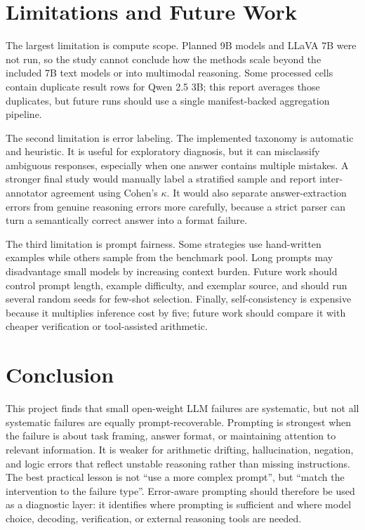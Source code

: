 \documentclass[10pt,twocolumn]{article}
\begin{document}
\section{Limitations and Future Work}
The largest limitation is compute scope. Planned 9B models and LLaVA 7B were not run, so the study cannot conclude how the methods scale beyond the included 7B text models or into multimodal reasoning. Some processed cells contain duplicate result rows for Qwen 2.5 3B; this report averages those duplicates, but future runs should use a single manifest-backed aggregation pipeline.

The second limitation is error labeling. The implemented taxonomy is automatic and heuristic. It is useful for exploratory diagnosis, but it can misclassify ambiguous responses, especially when one answer contains multiple mistakes. A stronger final study would manually label a stratified sample and report inter-annotator agreement using Cohen's $\kappa$. It would also separate answer-extraction errors from genuine reasoning errors more carefully, because a strict parser can turn a semantically correct answer into a format failure.

The third limitation is prompt fairness. Some strategies use hand-written examples while others sample from the benchmark pool. Long prompts may disadvantage small models by increasing context burden. Future work should control prompt length, example difficulty, and exemplar source, and should run several random seeds for few-shot selection. Finally, self-consistency is expensive because it multiplies inference cost by five; future work should compare it with cheaper verification or tool-assisted arithmetic.

\section{Conclusion}
This project finds that small open-weight LLM failures are systematic, but not all systematic failures are equally prompt-recoverable. Prompting is strongest when the failure is about task framing, answer format, or maintaining attention to relevant information. It is weaker for arithmetic drifting, hallucination, negation, and logic errors that reflect unstable reasoning rather than missing instructions. The best practical lesson is not ``use a more complex prompt'', but ``match the intervention to the failure type''. Error-aware prompting should therefore be used as a diagnostic layer: it identifies where prompting is sufficient and where model choice, decoding, verification, or external reasoning tools are needed.
\end{document}
